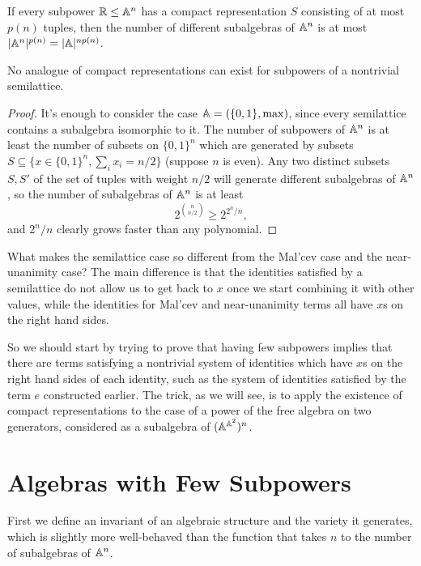 \documentclass[letterpaper,11pt]{article}
\begin{document}
\begin{prop} If every subpower $\mathbb{R} \le \mathbb{A}^n$ has a compact representation $S$ consisting of at most $p(n)$ tuples, then the number of different subalgebras of $\mathbb{A}^n$ is at most $|\mathbb{A}^n|^{p(n)} = |\mathbb{A}|^{np(n)}$.
\end{prop}

\begin{cor} No analogue of compact representations can exist for subpowers of a nontrivial semilattice.
\end{cor}
\begin{proof} It's enough to consider the case $\mathbb{A} = (\{0,1\},\max)$, since every semilattice contains a subalgebra isomorphic to it. The number of subpowers of $\mathbb{A}^n$ is at least the number of subsets on $\{0,1\}^n$ which are generated by subsets $S \subseteq \{x \in \{0,1\}^n, \sum_i x_i = n/2\}$ (suppose $n$ is even). Any two distinct subsets $S, S'$ of the set of tuples with weight $n/2$ will generate different subalgebras of $\mathbb{A}^n$, so the number of subalgebras of $\mathbb{A}^n$ is at least
\[
2^{\binom{n}{n/2}} \ge 2^{2^n/n},
\]
and $2^n/n$ clearly grows faster than any polynomial.
\end{proof}

What makes the semilattice case so different from the Mal'cev case and the near-unanimity case? The main difference is that the identities satisfied by a semilattice do not allow us to get back to $x$ once we start combining it with other values, while the identities for Mal'cev and near-unanimity terms all have $x$s on the right hand sides.

So we should start by trying to prove that having few subpowers implies that there are terms satisfying a nontrivial system of identities which have $x$s on the right hand sides of each identity, such as the system of identities satisfied by the term $e$ constructed earlier. The trick, as we will see, is to apply the existence of compact representations to the case of a power of the free algebra on two generators, considered as a subalgebra of $(\mathbb{A}^{\mathbb{A}^2})^n$.


\section{Algebras with Few Subpowers}

First we define an invariant of an algebraic structure and the variety it generates, which is slightly more well-behaved than the function that takes $n$ to the number of subalgebras of $\mathbb{A}^n$.
\end{document}
